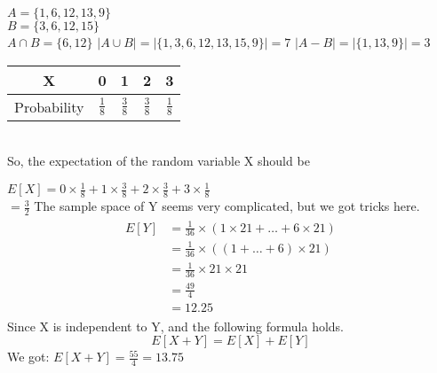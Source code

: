 \documentclass[12pt,twoside]{article}
\begin{document}

\begin{problems}

\problem %

\begin{problemparts}
\problempart %
$A=\{1,6,12,13,9\}$\\
$B=\{3,6,12,15\}$\\
$A\cap B=\{6,12\}$
\problempart %
$|A\cup B|=|\{1,3,6,12,13,15,9\}|=7$
\problempart %
$|A-B|=|\{1,13,9\}|=3$
\end{problemparts}

\problem  %

\begin{problemparts}
\problempart %
\begin{tabular}{|c|c|c|c|c|}
	\hline X&0&1&2&3\\
	\hline Probability&$\frac{1}{8}$&$\frac{3}{8}$&$\frac{3}{8}$&$\frac{1}{8}$\\
	\hline
\end{tabular}\\
So, the expectation of the random variable X should be 

$E[X] = 0\times\frac{1}{8}+1\times\frac{3}{8}+2\times\frac{3}{8}+3\times \frac{1}{8}$\\
$ = \frac{3}{2}$
\problempart %
The sample space of Y seems very complicated, but we got tricks here.
\begin{align}
    \begin{split}
            E[Y] &= \frac{1}{36}\times(1\times 21+\ldots +6\times21) \\
                &= \frac{1}{36}\times((1+\ldots+6)\times 21) \\
                &= \frac{1}{36}\times21\times21 \\
                &= \frac{49}{4} \\
                &= 12.25
    \end{split}
\end{align}
\problempart %
Since X is independent to Y, and the following formula holds.
$$E[X+Y]=E[X]+E[Y]$$
We got: $E[X+Y]=\frac{55}{4}=13.75$
\end{problemparts}


\end{problems}
\end{document}
